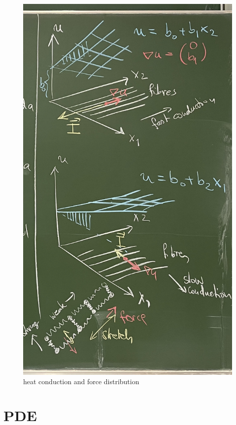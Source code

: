 \documentclass[11pt]{article}
\begin{document}
\begin{figure}
    \centering
    \includegraphics[width=0.5\linewidth]{IMG_2734.jpeg}
    \caption{heat conduction and force distribution}
    \label{fig:enter-label}
\end{figure}

\newpage
\date{15.11.2023}
\section*{PDE}
\end{document}
